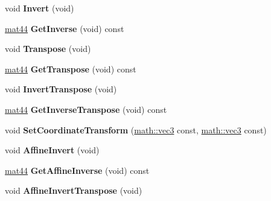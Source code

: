 \begin{DoxyCompactItemize}
\item 
\hypertarget{classmath_1_1mat44_aa21a256d780492901458b2dcb6908880}{
void {\bfseries Invert} (void)}
\label{classmath_1_1mat44_aa21a256d780492901458b2dcb6908880}

\item 
\hypertarget{classmath_1_1mat44_af9b3b74d816c3e7d254a7808f9ae815f}{
\hyperlink{classmath_1_1mat44}{mat44} {\bfseries GetInverse} (void) const }
\label{classmath_1_1mat44_af9b3b74d816c3e7d254a7808f9ae815f}

\item 
\hypertarget{classmath_1_1mat44_a77a16a2ca8130274fe605e8b6f15372f}{
void {\bfseries Transpose} (void)}
\label{classmath_1_1mat44_a77a16a2ca8130274fe605e8b6f15372f}

\item 
\hypertarget{classmath_1_1mat44_ae869e7c8084c5bfd91a1dad0638467f9}{
\hyperlink{classmath_1_1mat44}{mat44} {\bfseries GetTranspose} (void) const }
\label{classmath_1_1mat44_ae869e7c8084c5bfd91a1dad0638467f9}

\item 
\hypertarget{classmath_1_1mat44_a0f7756ca1627f1cae417e1b7af9216c7}{
void {\bfseries InvertTranspose} (void)}
\label{classmath_1_1mat44_a0f7756ca1627f1cae417e1b7af9216c7}

\item 
\hypertarget{classmath_1_1mat44_a824c23a19226781ba9b5bc3117c3ecb6}{
\hyperlink{classmath_1_1mat44}{mat44} {\bfseries GetInverseTranspose} (void) const }
\label{classmath_1_1mat44_a824c23a19226781ba9b5bc3117c3ecb6}

\item 
\hypertarget{classmath_1_1mat44_a02ddead709adf93f822196821b34dcf1}{
void {\bfseries SetCoordinateTransform} (\hyperlink{classmath_1_1vec3}{math::vec3} const, \hyperlink{classmath_1_1vec3}{math::vec3} const)}
\label{classmath_1_1mat44_a02ddead709adf93f822196821b34dcf1}

\item 
\hypertarget{classmath_1_1mat44_aa954879f5fda639e9ce406be3aa9ef49}{
void {\bfseries AffineInvert} (void)}
\label{classmath_1_1mat44_aa954879f5fda639e9ce406be3aa9ef49}

\item 
\hypertarget{classmath_1_1mat44_a2680b024ca307abf8955dccce433aba7}{
\hyperlink{classmath_1_1mat44}{mat44} {\bfseries GetAffineInverse} (void) const }
\label{classmath_1_1mat44_a2680b024ca307abf8955dccce433aba7}

\item 
\hypertarget{classmath_1_1mat44_a920f224091dd787fafe6131b94b54c30}{
void {\bfseries AffineInvertTranspose} (void)}
\label{classmath_1_1mat44_a920f224091dd787fafe6131b94b54c30}


\end{DoxyCompactItemize}
